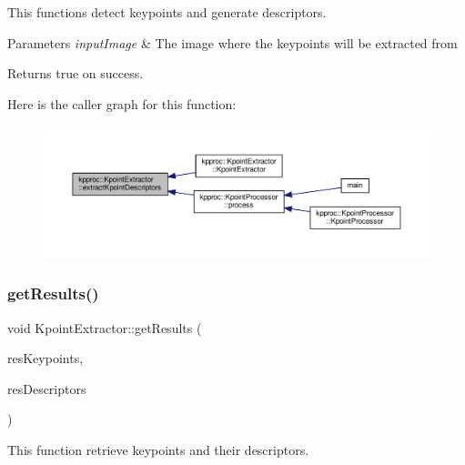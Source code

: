 This functions detect keypoints and generate descriptors. 


\begin{DoxyParams}{Parameters}
{\em input\+Image} & The image where the keypoints will be extracted from\\
\hline
\end{DoxyParams}
\begin{DoxyReturn}{Returns}
true on success. 
\end{DoxyReturn}
Here is the caller graph for this function\+:\nopagebreak
\begin{figure}[H]
\begin{center}
\leavevmode
\includegraphics[width=350pt]{classkpproc_1_1KpointExtractor_ade1efa4e540390775ed7158f57ca9618_icgraph}
\end{center}
\end{figure}
\mbox{\label{classkpproc_1_1KpointExtractor_a167e3596663206cb24e9eefe54baf4be}} 
\subsubsection{\texorpdfstring{get\+Results()}{getResults()}}
{\footnotesize\ttfamily void Kpoint\+Extractor\+::get\+Results (\begin{DoxyParamCaption}\item[{std\+::vector$<$ cv\+::\+Key\+Point $>$ \&}]{res\+Keypoints,  }\item[{cv\+::\+Mat \&}]{res\+Descriptors }\end{DoxyParamCaption})}



This function retrieve keypoints and their descriptors. 



